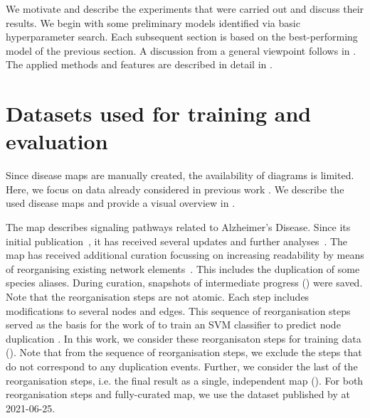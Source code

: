 \documentclass[
	fontsize=10pt, %
	twoside=true, %
	secnumdepth=1, %
  toc=indentunnumbered %
]{kaobook}
\begin{document}
We motivate and describe the experiments that were carried out and discuss their
results. We begin with some preliminary models identified via basic
hyperparameter search. Each subsequent section is based on the best-performing
model of the previous section. A discussion from a general viewpoint follows in
. The applied methods and features are described in detail in
.

\section{Datasets used for training and evaluation}
\label{sec:datasets-used}

Since disease maps are manually created, the availability of diagrams is
limited.
Here, we focus on data already considered in previous work
\cite{nielsen_MachineLearningSupport_2019}. We describe the used disease maps
and provide a visual overview in .

The  map describes signaling pathways related to Alzheimer's
Disease. Since its initial publication~\cite{mizuno_AlzPathwayComprehensiveMap_2012}, it has received several updates
and further analyses~\cite{ogishima_MapAlzheimerDiseasesignaling_2013,
  ogishima_AlzPathwayUpdatedMap_2016, mizuno_NetworkAnalysisComprehensive_2016}.
%
The map has received additional curation focussing on increasing readability by
means of reorganising existing network elements~\cite{ostaszewski_AlzPathwayRegorganisationSteps_2021}. This includes the
duplication of some species aliases. During curation, snapshots of intermediate
progress () were saved. Note that the reorganisation
steps are not atomic. Each step includes modifications to several nodes and
edges. This sequence of reorganisation steps served as the basis for the work of
\citeauthor{nielsen_MachineLearningSupport_2019} to train an SVM classifier to
predict node duplication \cite{nielsen_MachineLearningSupport_2019}. In this
work, we consider these reorganisaton steps for training data
(\ADMap{}). Note that from the sequence of reorganisation
steps, we exclude the steps that do not correspond to any duplication events.
Further, we consider the last of the reorganisation steps, i.e. the final result
as a single, independent map (\ADLast{}). For both
reorganisation steps and fully-curated map, we use the dataset published by
\citeauthor{ostaszewski_AlzPathwayRegorganisationSteps_2021}
\cite{ostaszewski_AlzPathwayRegorganisationSteps_2021} at 2021-06-25.
\end{document}
